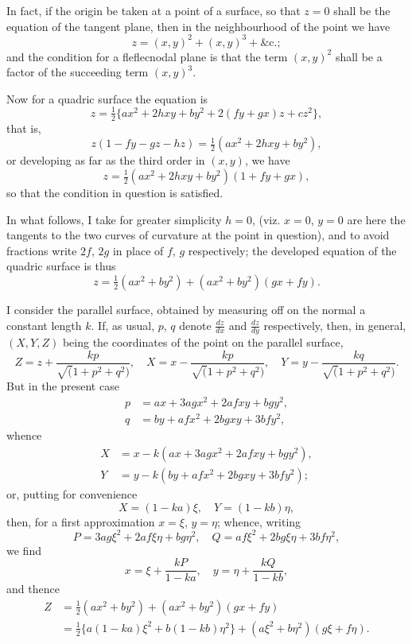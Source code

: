 \documentclass[11pt,a4paper]{book}
\begin{document}
In fact, if the origin be taken at a point of a surface, so that $z = 0$ shall be the equation of the tangent plane, then in the neighbourhood of the point we have
\[
z = (x,y)^2 + (x,y)^3 + \text{\&c.};
\]
and the condition for a fleflecnodal plane is that the term $(x,y)^2$ shall be a factor of the succeeding term $(x,y)^3$.

Now for a quadric surface the equation is
\[
z = \tfrac{1}{2}\{ax^2 + 2hxy + by^2 + 2(fy + gx)z + cz^2\},
\]
that is,
\[
z(1 - fy - gz - hz) = \tfrac{1}{2}(ax^2 + 2hxy + by^2),
\]
or developing as far as the third order in $(x, y)$, we have
\[
z = \tfrac{1}{2}(ax^2 + 2hxy + by^2)(1 + fy + gx),
\]
so that the condition in question is satisfied.

In what follows, I take for greater simplicity $h = 0$, (viz. $x = 0$, $y = 0$ are here the tangents to the two curves of curvature at the point in question), and to avoid fractions write $2f$, $2g$ in place of $f$, $g$ respectively; the developed equation of the quadric surface is thus
\[
z = \tfrac{1}{2}(ax^2 + by^2) + (ax^2 + by^2)(gx + fy).
\]

I consider the parallel surface, obtained by measuring off on the normal a constant length $k$. If, as usual, $p$, $q$ denote $\frac{dz}{dx}$ and $\frac{dz}{dy}$ respectively, then, in general, $(X, Y, Z)$ being the coordinates of the point on the parallel surface,
\[
Z = z + \frac{kp}{\surd(1 + p^2 + q^2)}, \quad X = x - \frac{kp}{\surd(1 + p^2 + q^2)}, \quad Y = y - \frac{kq}{\surd(1 + p^2 + q^2)}.
\]
But in the present case
\begin{align*}
p &= ax + 3agx^2 + 2afxy + bgy^2,\\
q &= by + afx^2 + 2bgxy + 3bfy^2,
\end{align*}
whence
\begin{align*}
X &= x - k(ax + 3agx^2 + 2afxy + bgy^2),\\
Y &= y - k(by + afx^2 + 2bgxy + 3bfy^2);
\end{align*}
or, putting for convenience
\[
X = (1 - ka)\xi, \quad Y = (1 - kb)\eta,
\]
then, for a first approximation $x = \xi$, $y = \eta$; whence, writing
\[
P = 3ag\xi^2 + 2af\xi\eta + bg\eta^2, \quad Q = af\xi^2 + 2bg\xi\eta + 3bf\eta^2,
\]
we find
\[
x = \xi + \frac{kP}{1 - ka}, \quad y = \eta + \frac{kQ}{1 - kb},
\]
and thence
\begin{align*}
Z &= \tfrac{1}{2}(ax^2 + by^2) + (ax^2 + by^2)(gx + fy) \\
&= \tfrac{1}{2}\{a(1 - ka)\xi^2 + b(1 - kb)\eta^2\} + (a\xi^2 + b\eta^2)(g\xi + f\eta).
\end{align*}
\end{document}
